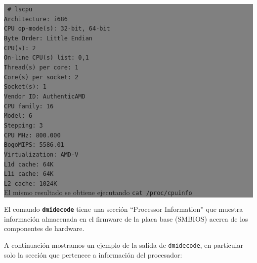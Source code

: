 \documentclass[12pt]{article}
\begin{document}
\colorbox{grey}{\parbox[t]{0.95\linewidth}{ \vspace*{0.5cm} { 
{\tt
\# lscpu \\
Architecture:          i686\\
CPU op-mode(s):        32-bit, 64-bit\\
Byte Order:            Little Endian\\
CPU(s):                2\\
On-line CPU(s) list:   0,1\\
Thread(s) per core:    1\\
Core(s) per socket:    2\\
Socket(s):             1\\
Vendor ID:             AuthenticAMD\\
CPU family:            16\\
Model:                 6\\
Stepping:              3\\
CPU MHz:               800.000\\
BogoMIPS:              5586.01\\
Virtualization:        AMD-V\\
L1d cache:             64K\\
L1i cache:             64K\\
L2 cache:              1024K\\
}
El mismo resultado se obtiene ejecutando \texttt{cat /proc/cpuinfo}
} \vspace*{0.5cm} } } 

El comando \textbf{\texttt{dmidecode}} tiene una sección ``Processor Information'' que muestra
información almacenada en el firmware de la placa base (SMBIOS) acerca de los componentes de 
hardware. 

A continuación mostramos un ejemplo de la salida de \texttt{dmidecode}, en particular 
solo la sección que pertenece a información del procesador:
\end{document}
